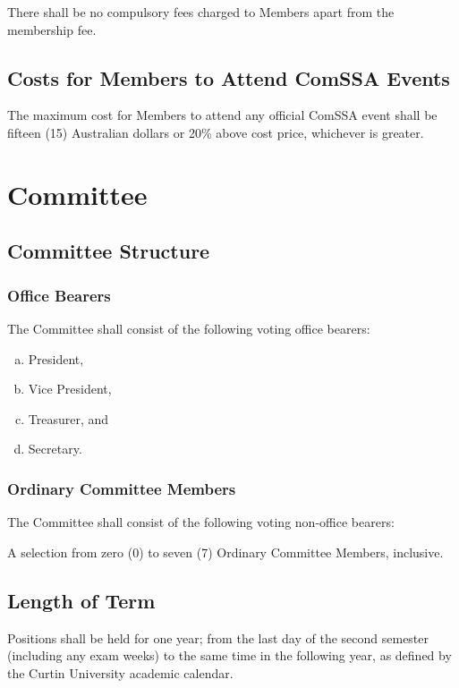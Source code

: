 \documentclass[a4paper,12pt]{article}
\begin{document}
There shall be no compulsory fees charged to Members apart from the membership fee.

\subsection{Costs for Members to Attend ComSSA Events}

The maximum cost for Members to attend any official ComSSA event shall be fifteen (15) Australian dollars or 20\% above cost price, whichever is greater.

\section{Committee}

\subsection{Committee Structure}

\subsubsection{Office Bearers}
\label{office_bearers}

The Committee shall consist of the following voting office bearers:

\begin{enumerate}[a)]
	\item President,
	\item Vice President,
	\item Treasurer, and
	\item Secretary.
\end{enumerate}

\subsubsection{Ordinary Committee Members}

The Committee shall consist of the following voting non-office bearers:

A selection from zero (0) to seven (7) Ordinary Committee Members, inclusive.

\subsection{Length of Term}

Positions shall be held for one year; from the last day of the second semester (including any exam weeks) to the same time in the following year, as defined by the Curtin University academic calendar.
\end{document}

